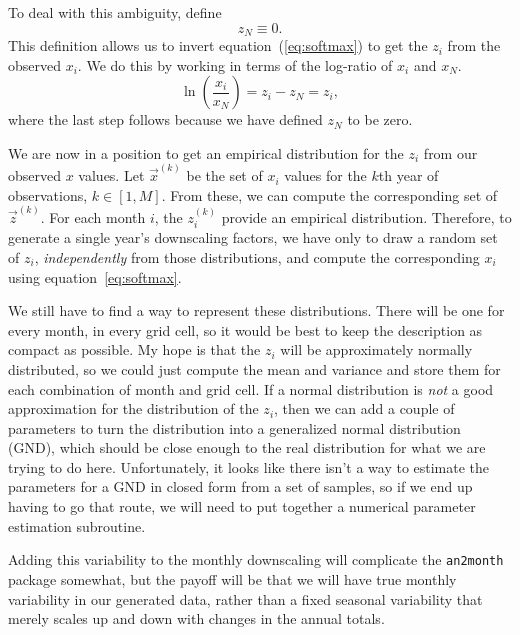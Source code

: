 \documentclass[11pt]{article}
\begin{document}
To deal with this ambiguity, define
\begin{equation}
  z_N \equiv 0.
\end{equation}
This definition allows us to invert equation~(\ref{eq:softmax}) to get
the $z_i$ from the observed $x_i$.  We do this by working in terms of
the log-ratio of $x_i$ and $x_N$.
\begin{equation}
  \ln\left(\frac{x_i}{x_N}\right) = z_i - z_N = z_i,
\end{equation}
where the last step follows because we have defined $z_N$ to be zero.

We are now in a position to get an empirical distribution for the
$z_i$ from our observed $x$ values.  Let $\vec{x}^{(k)}$ be the set of
$x_i$ values for the $k$th year of observations, $k \in [1,M]$.  From
these, we can compute the corresponding set of $\vec{z}^{(k)}$.  For
each month $i$, the $z_i^{(k)}$ provide an empirical distribution.
Therefore, to generate a single year's downscaling factors, we have
only to draw a random set of $z_i$, \emph{independently} from those
distributions, and compute the corresponding $x_i$ using
equation~\ref{eq:softmax}.

We still have to find a way to represent these distributions.  There
will be one for every month, in every grid cell, so it would be best
to keep the description as compact as possible.  My hope is that the
$z_i$ will be approximately normally distributed, so we could just
compute the mean and variance and store them for each combination of
month and grid cell.  If a normal distribution is \emph{not} a good
approximation for the distribution of the $z_i$, then we can add a
couple of parameters to turn the distribution into a generalized
normal distribution (GND), which should be close enough to the real
distribution for what we are trying to do here.  Unfortunately, it
looks like there isn't a way to estimate the parameters for a GND in
closed form from a set of samples, so if we end up having to go that
route, we will need to put together a numerical parameter estimation
subroutine.

Adding this variability to the monthly downscaling will complicate the
\texttt{an2month} package somewhat, but the payoff will be that we
will have true monthly variability in our generated data, rather than
a fixed seasonal variability that merely scales up and down with
changes in the annual totals.
\end{document}
